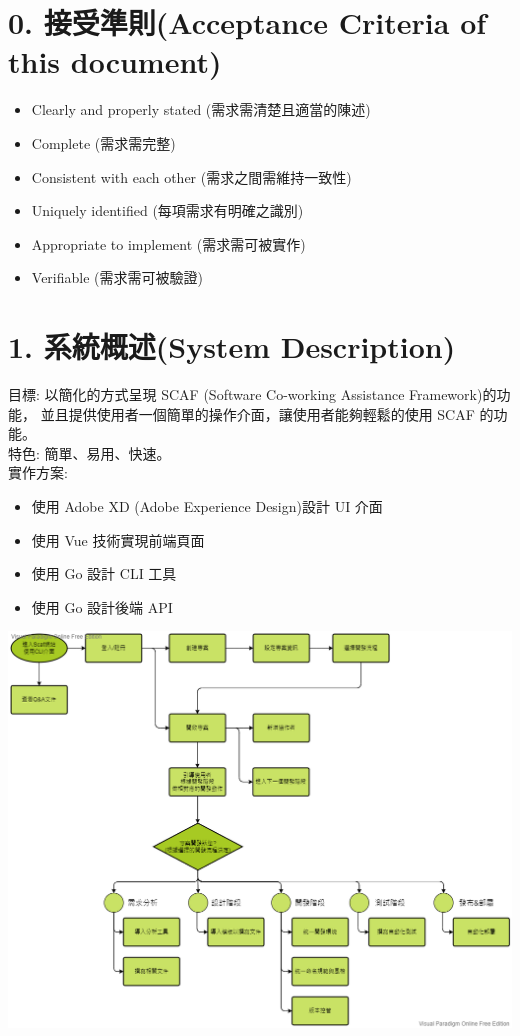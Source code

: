 \documentclass{report}
\begin{document}
\section*{0. 接受準則(Acceptance Criteria of this document)}
\begin{itemize}
  \item Clearly and properly stated (需求需清楚且適當的陳述)
  \item Complete (需求需完整)
  \item Consistent with each other (需求之間需維持一致性)
  \item Uniquely identified (每項需求有明確之識別)
  \item Appropriate to implement (需求需可被實作)
  \item Verifiable (需求需可被驗證)
\end{itemize}

\section*{1. 系統概述(System Description)}
目標: 以簡化的方式呈現 SCAF (Software Co-working Assistance Framework)的功能，
並且提供使用者一個簡單的操作介面，讓使用者能夠輕鬆的使用 SCAF 的功能。\\
特色: 簡單、易用、快速。\\
實作方案:
  \begin{itemize}
    \item 使用 Adobe XD (Adobe Experience Design)設計 UI 介面
    \item 使用 Vue 技術實現前端頁面
    \item 使用 Go 設計 CLI 工具
    \item 使用 Go 設計後端 API
  \end{itemize}
\includegraphics[width=\textwidth]{assets/system.png}
\end{document}
